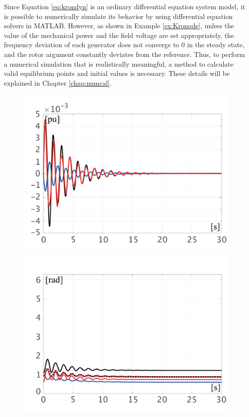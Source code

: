\documentclass[graybox, envcountchap]{svmult}
\begin{document}
Since Equation \ref{eq:krondyn} is an ordinary differential equation system
model, it is possible to numerically simulate its behavior by using differential
equation solvers in MATLAB. However, as shown in Example \ref{ex:Kronode},
unless the value of the mechanical power and the field voltage are set
appropriately, the frequency deviation of each generator does not converge to 0
in the steady state, and the rotor argument constantly deviates from the
reference. Thus, to perform a numerical simulation that is realistically
meaningful, a method to calculate valid equilibrium points and initial values is
necessary. These details will be explained in Chapter \ref{chap:numcal}.

\begin{figure}[t]
  \centering
  {
  \begin{minipage}{0.49\linewidth}
    \centering
    \includegraphics[width = 1.0\linewidth]{figs/Domega0}
    \medskip
  \end{minipage}
  \begin{minipage}{0.49\linewidth}
    \centering
    \includegraphics[width = 1.0\linewidth]{figs/delangV0}

\end{minipage}}
\end{figure}
\end{document}
